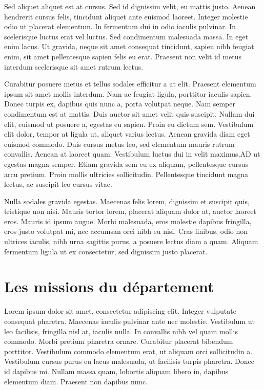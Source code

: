 \documentclass{report}
\begin{document}
Sed aliquet aliquet est at cursus. Sed id dignissim velit, eu mattis justo. Aenean hendrerit cursus felis, tincidunt aliquet ante euismod laoreet. Integer molestie odio ut placerat elementum. In fermentum dui in odio iaculis pulvinar. In scelerisque luctus erat vel luctus. Sed condimentum malesuada massa. In eget enim lacus. Ut gravida, neque sit amet consequat tincidunt, sapien nibh feugiat enim, sit amet pellentesque sapien felis eu erat. Praesent non velit id metus interdum scelerisque sit amet rutrum lectus.

Curabitur posuere metus et tellus sodales efficitur a at elit. Praesent elementum ipsum sit amet mollis interdum. Nam ac feugiat ligula, porttitor iaculis sapien. Donec turpis ex, dapibus quis nunc a, porta volutpat neque. Nam semper condimentum est at mattis. Duis auctor sit amet velit quis suscipit. Nullam dui elit, euismod ut posuere a, egestas eu sapien. Proin eu dictum sem. Vestibulum elit dolor, tempor at ligula ut, aliquet varius lectus. Aenean gravida diam eget euismod commodo. Duis cursus metus leo, sed elementum mauris rutrum convallis. Aenean at laoreet quam. Vestibulum luctus dui in velit maximus,\gls{AD} ut egestas magna semper. Etiam gravida sem eu ex aliquam, pellentesque cursus arcu pretium. Proin mollis ultricies sollicitudin. Pellentesque tincidunt magna lectus, ac suscipit leo cursus vitae.

Nulla sodales gravida egestas. Maecenas felis lorem, dignissim et suscipit quis, tristique non nisi. Mauris tortor lorem, placerat aliquam dolor at, auctor laoreet eros. Mauris id ipsum augue. Morbi malesuada, eros molestie dapibus fringilla, eros justo volutpat mi, nec accumsan orci nibh eu nisi. Cras finibus, odio non ultrices iaculis, nibh urna sagittis purus, a posuere lectus diam a quam. Aliquam fermentum ligula ut ex consectetur, sed dignissim justo placerat.

\section{Les missions du département}

Lorem ipsum dolor sit amet, consectetur adipiscing elit. Integer vulputate consequat pharetra. Maecenas iaculis pulvinar ante nec molestie. Vestibulum ut leo facilisis, fringilla nisl at, iaculis nulla. In convallis nibh vel quam mollis commodo. Morbi pretium pharetra ornare. Curabitur placerat bibendum porttitor. Vestibulum commodo elementum erat, ut aliquam orci sollicitudin a. Vestibulum cursus purus eu lacus malesuada, ut facilisis turpis pharetra. Donec id dapibus mi. Nullam massa quam, lobortis aliquam libero in, dapibus elementum diam. Praesent non dapibus nunc.
\end{document}

